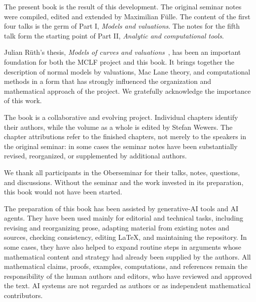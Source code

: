 \documentclass[11pt,a4paper,oneside]{book}
\begin{document}
The present book is the result of this development. The original seminar notes were compiled, edited and extended by Maximilian Fülle. The content of the first four talks is the germ of Part I, \emph{Models and valuations}. The notes for the fifth talk form the starting point of Part II, \emph{Analytic and computational tools}.

Julian Rüth's thesis, \emph{Models of curves and valuations}~\cite{Rueth}, has been an important foundation for both the MCLF project and this book.
It brings together the description of normal models by valuations, Mac Lane theory, and computational methods in a form that has strongly influenced the organization and mathematical approach of the project.
We gratefully acknowledge the importance of this work.

The book is a collaborative and evolving project.
Individual chapters identify their authors, while the volume as a whole is edited by Stefan Wewers.
The chapter attributions refer to the finished chapters, not merely to the speakers in the original seminar: in some cases the seminar notes have been substantially revised, reorganized, or supplemented by additional authors.

We thank all participants in the Oberseminar for their talks, notes, questions, and discussions.
Without the seminar and the work invested in its preparation, this book would not have been started.

\medskip\noindent
The preparation of this book has been assisted by generative-AI tools and AI agents.
They have been used mainly for editorial and technical tasks, including revising and reorganizing prose, adapting material from existing notes and sources, checking consistency, editing \LaTeX, and maintaining the repository.
In some cases, they have also helped to expand routine steps in arguments whose mathematical content and strategy had already been supplied by the authors.
All mathematical claims, proofs, examples, computations, and references remain the responsibility of the human authors and editors, who have reviewed and approved the text.
AI systems are not regarded as authors or as independent mathematical contributors.

% 

\mainmatter
\end{document}
